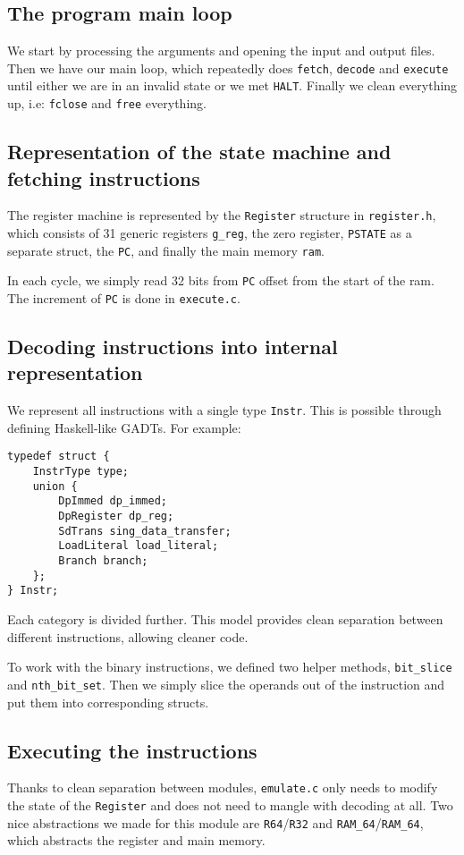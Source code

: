 \documentclass[11pt]{article}
\begin{document}
\subsection{The program main loop}
We start by processing the arguments and opening the input and output files.
Then we have our main loop, which repeatedly does \texttt{fetch},
\texttt{decode} and \texttt{execute} until either we are in an invalid state or
we met \texttt{HALT}. Finally we clean everything up, i.e: \texttt{fclose} and
\texttt{free} everything.

\subsection{Representation of the state machine and fetching instructions}

The register machine is represented by the \texttt{Register} structure in
\texttt{register.h}, which consists of 31 generic registers \texttt{g\_reg},
the zero register, \texttt{PSTATE} as a separate struct, the \texttt{PC}, and
finally the main memory \texttt{ram}.

In each cycle, we simply read 32 bits from \texttt{PC} offset from the start of
the ram. The increment of \texttt{PC} is done in \texttt{execute.c}.

\subsection{Decoding instructions into internal representation}

We represent all instructions with a single type \texttt{Instr}. This is
possible through defining Haskell-like GADTs. For example:

\begin{verbatim}
typedef struct {
    InstrType type;
    union {
        DpImmed dp_immed;
        DpRegister dp_reg;
        SdTrans sing_data_transfer;
        LoadLiteral load_literal;
        Branch branch;
    };
} Instr;
\end{verbatim}

Each category is divided further. This model provides clean separation between
different instructions, allowing cleaner code.

To work with the binary instructions, we defined two helper methods,
\texttt{bit\_slice} and \texttt{nth\_bit\_set}. Then we simply slice the
operands out of the instruction and put them into corresponding structs.

\subsection{Executing the instructions}
Thanks to clean separation between modules, \texttt{emulate.c} only needs to
modify the state of the \texttt{Register} and does not need to mangle with
decoding at all. Two nice abstractions we made for this module are
\texttt{R64}/\texttt{R32} and \texttt{RAM\_64}/\texttt{RAM\_64}, which
abstracts the register and main memory.
\end{document}
